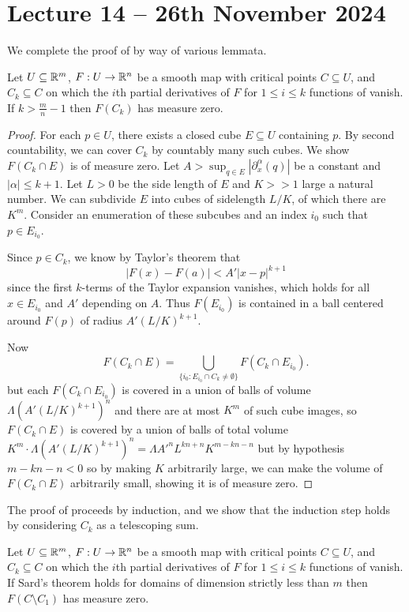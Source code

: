 \section{Lecture 14 -- 26th November 2024}\label{sec: lecture 14}
We complete the proof of  by way of various lemmata. 
\begin{lemma}\label{lem: Ck for k large have measure zero image}
    Let $U\subseteq\mathbb{R}^{m}$, $F:U\to\mathbb{R}^{n}$ be a smooth map with critical points $C\subseteq U$, and $C_{k}\subseteq C$ on which the $i$th partial derivatives of $F$ for $1\leq i\leq k$ functions of vanish. If $k>\frac{m}{n}-1$ then $F(C_{k})$ has measure zero.
\end{lemma}
\begin{proof}
    For each $p\in U$, there exists a closed cube $E\subseteq U$ containing $p$. By second countability, we can cover $C_{k}$ by countably many such cubes. We show $F(C_{k}\cap E)$ is of measure zero. Let $A>\sup_{q\in E}|\partial_{x}^{\alpha}(q)|$ be a constant and $|\alpha|\leq k+1$. Let $L>0$ be the side length of $E$ and $K>>1$ large a natural number. We can subdivide $E$ into cubes of sidelength $L/K$, of which there are $K^{m}$. Consider an enumeration of these subcubes and an index $i_{0}$ such that $p\in E_{i_{0}}$. 

    Since $p\in C_{k}$, we know by Taylor's theorem that 
    $$|F(x)-F(a)|<A'|x-p|^{k+1}$$
    since the first $k$-terms of the Taylor expansion vanishes, which holds for all $x\in E_{i_{0}}$ and $A'$ depending on $A$. Thus $F(E_{i_{0}})$ is contained in a ball centered around $F(p)$ of radius $A'(L/K)^{k+1}$. 

    Now 
    $$F(C_{k}\cap E)=\bigcup_{\{i_{0}:E_{i_{0}}\cap C_{k}\neq\emptyset\}}F(C_{k}\cap E_{i_{0}}).$$
    but each $F(C_{k}\cap E_{i_{0}})$ is covered in a union of balls of volume $\Lambda\left(A'(L/K)^{k+1}\right)^{n}$ and there are at most $K^{m}$ of such cube images, so $F(C_{k}\cap E)$ is covered by a union of balls of total volume $K^{m}\cdot\Lambda\left(A'(L/K)^{k+1}\right)^{n}=\Lambda A'^{n}L^{kn+n}K^{m-kn-n}$ but by hypothesis $m-kn-n<0$ so by making $K$ arbitrarily large, we can make the volume of $F(C_{k}\cap E)$ arbitrarily small, showing it is of measure zero. 
\end{proof}
The proof of  proceeds by induction, and we show that the induction step holds by considering $C_{k}$ as a telescoping sum. 
\begin{lemma}\label{lem: C minus C1 is measure zero}
    Let $U\subseteq\mathbb{R}^{m}$, $F:U\to\mathbb{R}^{n}$ be a smooth map with critical points $C\subseteq U$, and $C_{k}\subseteq C$ on which the $i$th partial derivatives of $F$ for $1\leq i\leq k$ functions of vanish. If Sard's theorem holds for domains of dimension strictly less than $m$ then $F(C\setminus C_{1})$ has measure zero. 
\end{lemma}

